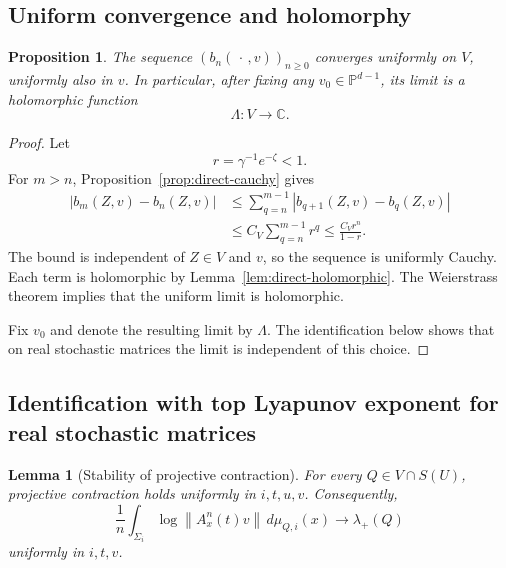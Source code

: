 \documentclass[11pt,a4paper]{amsart}
\newtheorem{proposition}[theorem]{Proposition}
\newtheorem{lemma}[theorem]{Lemma}
\newcommand{\C}{\mathbb C}
\newcommand{\PP}{\mathbb P}
\newcommand{\norm}[1]{\left\lVert #1\right\rVert}
\begin{document}
\subsection{Uniform convergence and holomorphy}

\begin{proposition}\label{prop:direct-limit}
The sequence \((b_n(\,\cdot\,,v))_{n\ge0}\) converges uniformly on
\(V\), uniformly also in \(v\).  In particular, after fixing any
\(v_0\in\PP^{d-1}\), its limit is a holomorphic function
\[
 \Lambda:V\longrightarrow\C.
\]
\end{proposition}

\begin{proof}
Let
\[
 r=\gamma^{-1}e^{-\zeta}<1.
\]
For \(m>n\), Proposition~\ref{prop:direct-cauchy} gives
\[
\begin{aligned}
 |b_m(Z,v)-b_n(Z,v)|
 &\le\sum_{q=n}^{m-1}
       |b_{q+1}(Z,v)-b_q(Z,v)|\\
 &\le C_V\sum_{q=n}^{m-1}r^q
 \le\frac{C_Vr^n}{1-r}.
\end{aligned}
\]
The bound is independent of \(Z\in V\) and \(v\), so the sequence is
uniformly Cauchy.  Each term is holomorphic by
Lemma~\ref{lem:direct-holomorphic}.  The Weierstrass theorem implies
that the uniform limit is holomorphic.

Fix \(v_0\) and denote the resulting limit by \(\Lambda\).  The
identification below shows that on real stochastic matrices the limit
is independent of this choice.%
\end{proof}

\subsection{Identification with top Lyapunov exponent for real stochastic matrices}

\begin{lemma}[Stability of projective contraction]\label{lem:real-stability}
For every \(Q\in V\cap S(U)\), projective contraction holds uniformly
in \(i,t,u,v\).  Consequently,
\[
 \frac1n\int_{\Sigma_i}
 \log\norm{A_x^n(t)v}\,d\mu_{Q,i}(x)
 \longrightarrow\lambda_+(Q)
\]
uniformly in \(i,t,v\).
\end{lemma}
\end{document}
